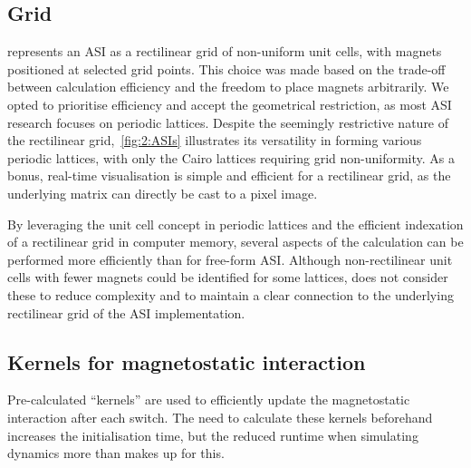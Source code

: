 \subsection{Grid}
\hotspice{} represents an ASI as a rectilinear grid of non-uniform unit cells, with magnets positioned at selected grid points.
This choice was made based on the trade-off between calculation efficiency and the freedom to place magnets arbitrarily.
We opted to prioritise efficiency and accept the geometrical restriction, as most ASI research focuses on periodic lattices.
Despite the seemingly restrictive nature of the rectilinear grid,~\cref{fig:2:ASIs} illustrates its versatility in forming various periodic lattices, with only the Cairo lattices requiring grid non-uniformity.
As a bonus, real-time visualisation is simple and efficient for a rectilinear grid, as the underlying matrix can directly be cast to a pixel image. \par
By leveraging the unit cell concept in periodic lattices and the efficient indexation of a rectilinear grid in computer memory, several aspects of the calculation can be performed more efficiently than for free-form ASI.
Although non-rectilinear unit cells with fewer magnets could be identified for some lattices, \hotspice{} does not consider these to reduce complexity and to maintain a clear connection to the underlying rectilinear grid of the ASI implementation.

\subsection{Kernels for magnetostatic interaction}\label{sec:2:Kernels}
Pre-calculated ``kernels'' are used to efficiently update the magnetostatic interaction after each switch. 
The need to calculate these kernels beforehand increases the initialisation time, but the reduced runtime when simulating dynamics more than makes up for this.

